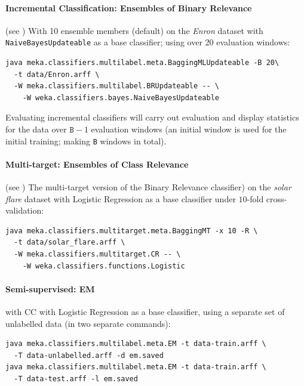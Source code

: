 \documentclass[11pt]{article}
\newcommand{\MEKA}{Meka}
\newcommand{\MOA}{Moa}
\begin{document}

\paragraph{Incremental Classification: Ensembles of Binary Relevance} (see \cite{ECC2,MEDS2}) With 10 ensemble members (default) on the \textit{Enron} dataset with \texttt{NaiveBayesUpdateable} as a base classifier; using over 20 evaluation windows:

\begin{lstlisting}
java meka.classifiers.multilabel.meta.BaggingMLUpdateable -B 20\
  -t data/Enron.arff \
  -W meka.classifiers.multilabel.BRUpdateable -- \
    -W weka.classifiers.bayes.NaiveBayesUpdateable
\end{lstlisting}

Evaluating incremental classifiers will carry out evaluation and display statistics for the data over $\texttt{B}-1$ evaluation windows (an initial window is used for the initial training; making \texttt{B} windows in total). %

\paragraph{Multi-target: Ensembles of Class Relevance} (see \cite{UPM}) The multi-target version of the Binary Relevance classifier) on the \textit{solar flare} dataset with Logistic Regression as a base classifier under $10$-fold cross-validation:
\begin{lstlisting}
java meka.classifiers.multitarget.meta.BaggingMT -x 10 -R \
  -t data/solar_flare.arff \
  -W meka.classifiers.multitarget.CR -- \
    -W weka.classifiers.functions.Logistic
\end{lstlisting}
 
\paragraph{Semi-supervised: EM} with CC with Logistic Regression as a base classifier, using a separate set of unlabelled data (in two separate commands):
\begin{lstlisting}
java meka.classifiers.multilabel.meta.EM -t data-train.arff \
  -T data-unlabelled.arff -d em.saved
java meka.classifiers.multilabel.meta.EM -t data-train.arff \
  -T data-test.arff -l em.saved
\end{lstlisting}
\end{document}
